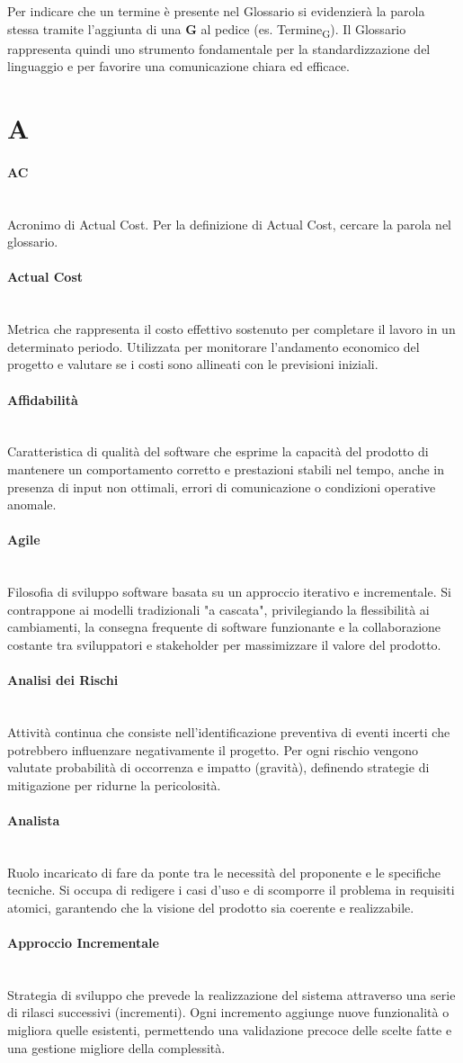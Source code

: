 \documentclass[a4paper, 10pt, colorlinks=true, linkcolor=black, urlcolor=blue, citecolor=blue, hidelinks]{article}
\newcommand{\glossaryterm}[2]{
    \paragraph{#1 \label{term:#1}} \mbox{} \\
    #2
    \vspace{0.5em}
}
\begin{document}
Per indicare che un termine è presente nel Glossario si evidenzierà la parola stessa tramite l'aggiunta di una \textbf{G} al pedice (es. Termine\textsubscript{G}). Il Glossario rappresenta quindi uno strumento fondamentale per la standardizzazione del linguaggio e per favorire una comunicazione chiara ed efficace.

\newpage

\section*{A}

\glossaryterm{AC}{Acronimo di Actual Cost. Per la definizione di Actual Cost, cercare la parola nel glossario.}

\glossaryterm{Actual Cost}{Metrica che rappresenta il costo effettivo sostenuto per completare il lavoro in un determinato periodo. Utilizzata per monitorare l'andamento economico del progetto e valutare se i costi sono allineati con le previsioni iniziali.}

\glossaryterm{Affidabilità}{Caratteristica di qualità del software che esprime la capacità del prodotto di mantenere un comportamento corretto e prestazioni stabili nel tempo, anche in presenza di input non ottimali, errori di comunicazione o condizioni operative anomale.}

\glossaryterm{Agile}{Filosofia di sviluppo software basata su un approccio iterativo e incrementale. Si contrappone ai modelli tradizionali "a cascata", privilegiando la flessibilità ai cambiamenti, la consegna frequente di software funzionante e la collaborazione costante tra sviluppatori e stakeholder per massimizzare il valore del prodotto.}

\glossaryterm{Analisi dei Rischi}{Attività continua che consiste nell'identificazione preventiva di eventi incerti che potrebbero influenzare negativamente il progetto. Per ogni rischio vengono valutate probabilità di occorrenza e impatto (gravità), definendo strategie di mitigazione per ridurne la pericolosità.}

\glossaryterm{Analista}{Ruolo incaricato di fare da ponte tra le necessità del proponente e le specifiche tecniche. Si occupa di redigere i casi d'uso e di scomporre il problema in requisiti atomici, garantendo che la visione del prodotto sia coerente e realizzabile.}

\glossaryterm{Approccio Incrementale}{Strategia di sviluppo che prevede la realizzazione del sistema attraverso una serie di rilasci successivi (incrementi). Ogni incremento aggiunge nuove funzionalità o migliora quelle esistenti, permettendo una validazione precoce delle scelte fatte e una gestione migliore della complessità.}
\end{document}
